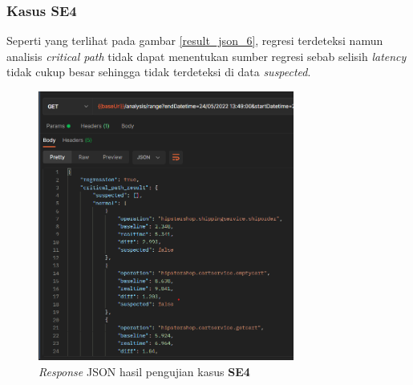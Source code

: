 \subsubsection{Kasus SE4}
Seperti yang terlihat pada gambar \ref{result_json_6}, regresi terdeteksi namun analisis \textit{critical path} tidak dapat menentukan sumber regresi sebab selisih \textit{latency} tidak cukup besar sehingga tidak terdeteksi di data \textit{suspected}.
\begin{figure}[!htb]
	\centering
	\includegraphics[width=0.75\textwidth]{resources/ch4/json/11.png}
	\caption{\textit{Response} JSON hasil pengujian kasus \textbf{SE4}}
	\label{result_json_9}
\end{figure}

\pagebreak

